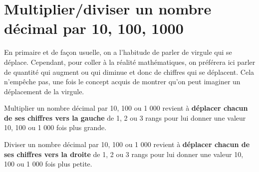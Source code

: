 \section{Multiplier/diviser un nombre décimal par 10, 100, 1000}
\prof
{En primaire et de façon usuelle, on a l'habitude de parler de virgule qui se déplace. Cependant, pour coller à la réalité mathématiques, on préférera ici parler de quantité qui augment ou qui diminue et donc de chiffres qui se déplacent. Cela n'empêche pas, une fois le concept acquis de montrer qu'on peut imaginer un déplacement de la virgule.}

\begin{aconnaitre}

\hspace{2em}\textbullet\hspace{.25em} Multiplier un nombre décimal par 10, 100 ou 1 000 revient à \textbf{\textcolor{C2}{déplacer chacun de ses chiffres vers la gauche}} de 1, 2 ou 3 rangs pour lui donner une valeur 10, 100 ou 1 000 fois plus grande.

\hspace{2em}\textbullet\hspace{.25em} Diviser un nombre décimal par 10, 100 ou 1 000 revient à \textbf{\textcolor{C2}{déplacer chacun de ses chiffres vers la droite}} de 1, 2 ou 3 rangs pour lui donner une valeur 10, 100 ou 1 000 fois plus petite.

\end{aconnaitre}

